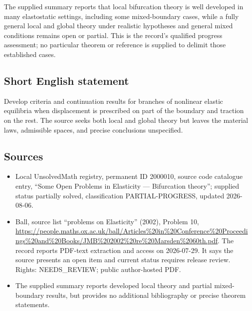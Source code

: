 \documentclass[11pt]{article}
\begin{document}
The supplied summary reports that local bifurcation theory is well developed in many elastostatic settings, including some mixed-boundary cases, while a fully general local and global theory under realistic hypotheses and general mixed conditions remains open or partial. This is the record's qualified progress assessment; no particular theorem or reference is supplied to delimit those established cases.
\subsection{Short English statement}
Develop criteria and continuation results for branches of nonlinear elastic equilibria when displacement is prescribed on part of the boundary and traction on the rest. The source seeks both local and global theory but leaves the material laws, admissible spaces, and precise conclusions unspecified.
\subsection{Sources}
\begin{itemize}
\item Local UnsolvedMath registry, permanent ID 2000010, source code catalogue entry, ``Some Open Problems in Elasticity --- Bifurcation theory''; supplied status partially solved, classification PARTIAL-PROGRESS, updated 2026-08-06.
\item Ball, source list ``problems on Elasticity'' (2002), Problem 10, \url{https://people.maths.ox.ac.uk/ball/Articles%20in%20Conference%20Proceedings%20and%20Books/JMB%202002%20re%20Marsden%2060th.pdf}. The record reports PDF-text extraction and access on 2026-07-29. It says the source presents an open item and current status requires release review. Rights: NEEDS\_REVIEW; public author-hosted PDF.
\item The supplied summary reports developed local theory and partial mixed-boundary results, but provides no additional bibliography or precise theorem statements.
\end{itemize}
\end{document}
